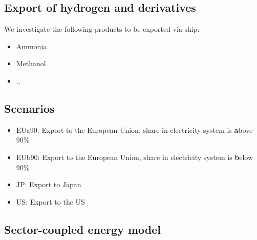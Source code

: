 \subsection{Export of hydrogen and derivatives}

We investigate the following products to be exported via ship:
\begin{itemize}
    \item Ammonia
    \item Methanol
    \item ..
\end{itemize}


\subsection{Scenarios}
\begin{itemize}
    \item EUa90: Export to the European Union, share in electricity system is {\bf{a}}bove 90\%
    \item EUb90: Export to the European Union, share in electricity system is {\bf{b}}elow 90\%
    \item JP: Export to Japan
    \item US: Export to the US
\end{itemize}

\subsection{Sector-coupled energy model}